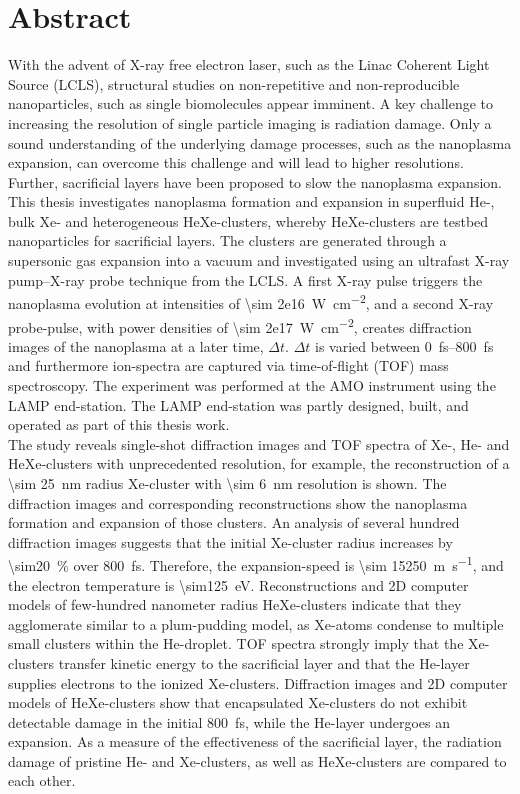 \section*{Abstract}\label{ch:abstract}
With the advent of X-ray free electron laser, such as the Linac Coherent Light Source (LCLS), structural studies on non-repetitive and non-reproducible nanoparticles, such as single biomolecules appear imminent. A key challenge to increasing the resolution of single particle imaging is radiation damage. Only a sound understanding of the underlying damage processes, such as the nanoplasma expansion, can overcome this challenge and will lead to higher resolutions. Further, sacrificial layers have been proposed to slow the nanoplasma expansion.\\[0.4\baselineskip]
%
This thesis investigates nanoplasma formation and expansion in superfluid He-, bulk Xe- and heterogeneous HeXe-clusters, whereby HeXe-clusters are testbed nanoparticles for sacrificial layers. The clusters are generated through a supersonic gas expansion into a vacuum and investigated using an ultrafast X-ray pump--X-ray probe technique from the LCLS. A first X-ray pulse triggers the nanoplasma evolution at intensities of \SI{\sim 2e16}{\watt\per\square\centi\meter}, and a second X-ray probe-pulse, with power densities of \SI{\sim 2e17}{\watt\per\square\centi\meter}, creates diffraction images of the nanoplasma at a later time, $\Delta t$. $\Delta t$ is varied between \SIrange{0}{800}{\femto\second} and furthermore ion-spectra are captured via time-of-flight (TOF) mass spectroscopy. The experiment was performed at the AMO instrument using the LAMP end-station. The LAMP end-station was partly designed, built, and operated as part of this thesis work.\\[0.4\baselineskip]
%
The study reveals single-shot diffraction images and TOF spectra of Xe-, He- and HeXe-clusters with unprecedented resolution, for example, the reconstruction of a \SI{\sim 25}{\nano\meter} radius Xe-cluster with \SI{\sim 6}{\nano\meter} resolution is shown. The diffraction images and corresponding reconstructions show the nanoplasma formation and expansion of those clusters. An analysis of several hundred diffraction images suggests that the initial Xe-cluster radius increases by \SI{\sim20}{\percent} over \SI{800}{\femto\second}. Therefore, the expansion-speed is \SI{\sim 15250}{\meter\per\second}, and the electron temperature is \SI{\sim125}{\electronvolt}. Reconstructions and 2D computer models of few-hundred nanometer radius HeXe-clusters indicate that they agglomerate similar to a plum-pudding model, as Xe-atoms condense to multiple small clusters within the He-droplet. TOF spectra strongly imply that the Xe-clusters transfer kinetic energy to the sacrificial layer and that the He-layer supplies electrons to the ionized Xe-clusters. Diffraction images and 2D computer models of HeXe-clusters show that encapsulated Xe-clusters do not exhibit detectable damage in the initial \SI{800}{\femto\second}, while the He-layer undergoes an expansion. As a measure of the effectiveness of the sacrificial layer, the radiation damage of pristine He- and Xe-clusters, as well as HeXe-clusters are compared to each other.
%
%
%
%